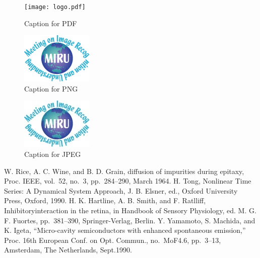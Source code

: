 \documentclass[MIRU,submit,english]{miru2023e}
\begin{document}
\begin{figure}[h]
    \centering
    \texttt{[image: logo.pdf]}
    \caption{Caption for PDF}
    \label{fig:my_label1}
\end{figure}

\begin{figure}[h]
    \centering
    \includegraphics[width=.3\linewidth]{logo.png}
    \caption{Caption for PNG}
    \label{fig:my_label2}
\end{figure}

\begin{figure}[h]
    \centering
    \includegraphics[width=.3\linewidth]{logo.jpg}
    \caption{Caption for JPEG}
    \label{fig:my_label3}
\end{figure}

%

%
%

\begin{thebibliography}{9}%
W. Rice, A. C. Wine, and B. D. Grain,
diffusion of impurities during epitaxy,
Proc. IEEE, vol.~52, no.~3, pp.~284--290, March 1964.
 H. Tong, Nonlinear Time Series: A Dynamical System Approach, J. B. Elsner, ed., Oxford University Press, Oxford, 1990.
H. K. Hartline, A. B. Smith, and F. Ratlliff,
Inhibitoryinteraction in the retina,
in Handbook of Sensory Physiology,
ed. M. G. F. Fuortes, pp.~381--390, Springer-Verlag, Berlin.
Y. Yamamoto, S. Machida, and K. Igeta,
``Micro-cavity semiconductors with enhanced spontaneous emission,''
Proc. 16th European Conf. on Opt. Commun.,
no.~MoF4.6, pp.~3--13, Amsterdam, The Netherlands, Sept.1990.
\end{thebibliography}
\end{document}
